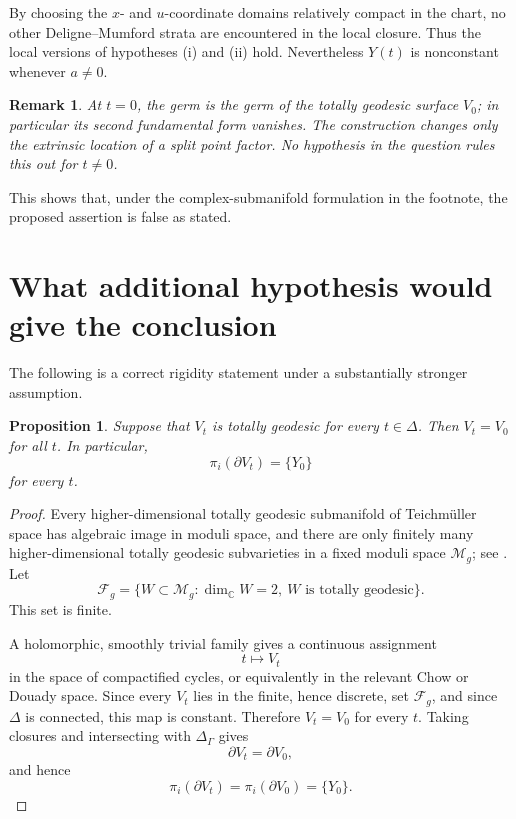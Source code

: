 \documentclass[11pt]{article}
\newcommand{\M}{\mathcal M}
\newcommand{\C}{\mathbb C}
\newcommand{\D}{\Delta}
\newtheorem{proposition}[theorem]{Proposition}
\newtheorem{remark}[theorem]{Remark}
\begin{document}
By choosing the \(x\)- and \(u\)-coordinate domains relatively compact in the
chart, no other Deligne--Mumford strata are encountered in the local closure.
Thus the local versions of hypotheses (i) and (ii) hold.  Nevertheless
\(Y(t)\) is nonconstant whenever \(a\neq 0\).

\begin{remark}
At \(t=0\), the germ is the germ of the totally geodesic surface \(V_0\); in
particular its second fundamental form vanishes.  The construction changes
only the extrinsic location of a split point factor.  No hypothesis in the
question rules this out for \(t\neq0\).
\end{remark}

This shows that, under the complex-submanifold formulation in the footnote,
the proposed assertion is false as stated.

\section{What additional hypothesis would give the conclusion}

The following is a correct rigidity statement under a substantially stronger
assumption.

\begin{proposition}
Suppose that \(V_t\) is totally geodesic for every \(t\in\D\).  Then
\(V_t=V_0\) for all \(t\).  In particular,
\[
\pi_i(\partial V_t)=\{Y_0\}
\]
for every \(t\).
\end{proposition}

\begin{proof}
Every higher-dimensional totally geodesic submanifold of Teichm\"uller space
has algebraic image in moduli space, and there are only finitely many
higher-dimensional totally geodesic subvarieties in a fixed moduli space
\(\M_g\); see \cite{AW}.  Let
\[
\mathscr F_g
=
\{W\subset\M_g:\dim_{\C}W=2,\ W\text{ is totally geodesic}\}.
\]
This set is finite.

A holomorphic, smoothly trivial family gives a continuous assignment
\[
t\longmapsto V_t
\]
in the space of compactified cycles, or equivalently in the relevant Chow or
Douady space.  Since every \(V_t\) lies in the finite, hence discrete, set
\(\mathscr F_g\), and since \(\D\) is connected, this map is constant.
Therefore \(V_t=V_0\) for every \(t\).  Taking closures and intersecting with
\(\Delta_\Gamma\) gives
\[
\partial V_t=\partial V_0,
\]
and hence
\[
\pi_i(\partial V_t)=\pi_i(\partial V_0)=\{Y_0\}.
\]
\end{proof}
\end{document}
